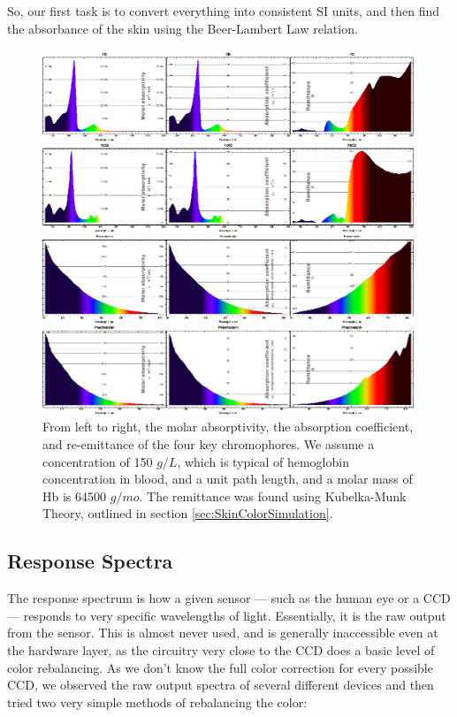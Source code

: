 So, our first task is to convert everything into consistent SI units, and then find the absorbance of the skin using the Beer-Lambert Law relation.

\begin{figure}[h!]
  \centering
    \includegraphics[width=0.99\textwidth]{Chapter1/Figs/ChemicalSpectralProperties.eps}
    \caption{From left to right, the molar absorptivity, the absorption coefficient, and re-emittance of the four key chromophores. We assume a concentration of 150 $g/L$, which is typical of hemoglobin concentration in blood, and a unit path length, and a molar mass of Hb is 64500 $g/mo$. The remittance was found using Kubelka-Munk Theory, outlined in section \ref{sec:SkinColorSimulation}. }  \label{fig:ChemicalSpectralProperties}
\end{figure}



\subsection{Response Spectra}

The response spectrum is how a given sensor --- such as the human eye or a CCD --- responds to very specific wavelengths of light. Essentially, it is the raw output from the sensor. This is almost never used, and is generally inaccessible even at the hardware layer, as the circuitry very close to the CCD does a basic level of color rebalancing. As we don't know the full color correction for every possible CCD, we observed the raw output spectra of several different devices and then tried two very simple methods of rebalancing the color:

